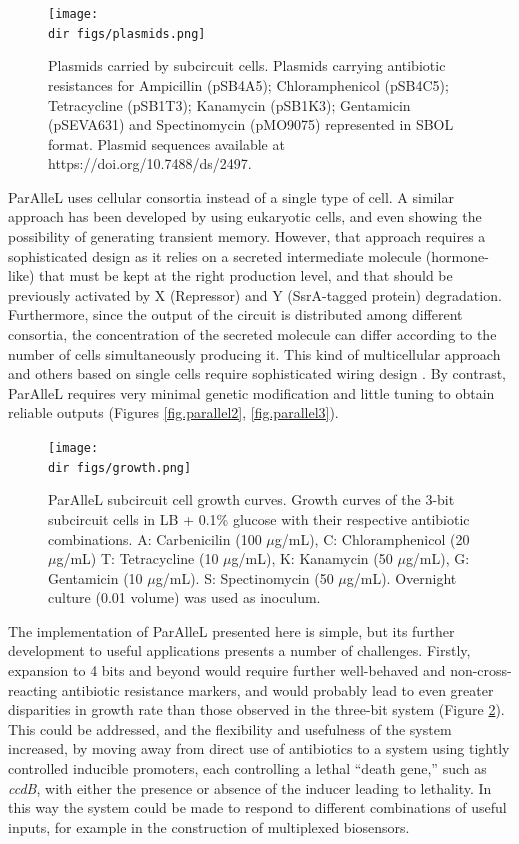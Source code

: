\begin{figure}[htbp]
  \centering
  \texttt{[image: \\dir figs/plasmids.png]}
  \caption{Plasmids carried by subcircuit cells. Plasmids carrying antibiotic resistances for Ampicillin (pSB4A5); Chloramphenicol (pSB4C5); Tetracycline (pSB1T3); Kanamycin (pSB1K3); Gentamicin (pSEVA631) and Spectinomycin (pMO9075) represented in SBOL format. Plasmid sequences available at https://doi.org/10.7488/ds/2497.}
  \label{fig.parallel4}
\end{figure}

ParAlleL uses cellular consortia instead of a single type of cell. A similar approach has been developed by \citet{macia2016implementation} using eukaryotic cells, and even showing the possibility of generating transient memory. However, that approach requires a sophisticated design as it relies on a secreted intermediate molecule (hormone-like) that must be kept at the right production level, and that should be previously activated by X (Repressor) and Y (SsrA-tagged protein) degradation. Furthermore, since the output of the circuit is distributed among different consortia, the concentration of the secreted molecule can differ according to the number of cells simultaneously producing it. This kind of multicellular approach and others based on single cells require sophisticated wiring design \citep{silva2008mining,siuti2013synthetic,macia2016implementation,macia2017synthetic}. By contrast, ParAlleL requires very minimal genetic modification and little tuning to obtain reliable outputs (Figures \ref{fig.parallel2}, \ref{fig.parallel3}).

\begin{figure}[htbp]
  \centering
  \texttt{[image: \\dir figs/growth.png]}
  \caption{ParAlleL subcircuit cell growth curves. Growth curves of the 3-bit subcircuit cells in LB + 0.1\% glucose with their respective antibiotic combinations. A: Carbenicilin (100 $\mu$g/mL), C: Chloramphenicol (20 $\mu$g/mL) T: Tetracycline (10 $\mu$g/mL), K: Kanamycin (50 $\mu$g/mL), G: Gentamicin (10 $\mu$g/mL). S: Spectinomycin (50 $\mu$g/mL). Overnight culture (0.01 volume) was used as inoculum.}
  \label{fig.parallel5}
\end{figure}


The implementation of ParAlleL presented here is simple, but its further development to useful applications presents a number of challenges. Firstly, expansion to 4 bits and beyond would require further well-behaved and non-cross-reacting antibiotic resistance markers, and would probably lead to even greater disparities in growth rate than those observed in the three-bit system (Figure \ref{fig.parallel5}). This could be addressed, and the flexibility and usefulness of the system increased, by moving away from direct use of antibiotics to a system using tightly controlled inducible promoters, each controlling a lethal “death gene,” such as \textit{ccdB}, with either the presence or absence of the inducer leading to lethality. In this way the system could be made to respond to different combinations of useful inputs, for example in the construction of multiplexed biosensors.

